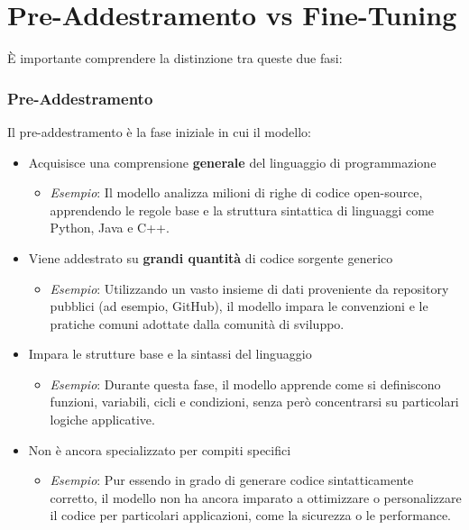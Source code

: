 \documentclass[12pt,a4paper,openright,twoside]{book}
\begin{document}
\section{Pre-Addestramento vs Fine-Tuning} 
È importante comprendere la distinzione tra queste due fasi:
   
\subsubsection{Pre-Addestramento}
Il pre-addestramento è la fase iniziale in cui il modello:
\begin{itemize}
    \item Acquisisce una comprensione \textbf{generale} del linguaggio di programmazione
        \begin{itemize}
            \item \textit{Esempio}: Il modello analizza milioni di righe di codice open-source, apprendendo le regole base e la struttura sintattica di linguaggi come Python, Java e C++.
        \end{itemize}
    \item Viene addestrato su \textbf{grandi quantità} di codice sorgente generico
        \begin{itemize}
            \item \textit{Esempio}: Utilizzando un vasto insieme di dati proveniente da repository pubblici (ad esempio, GitHub), il modello impara le convenzioni e le pratiche comuni adottate dalla comunità di sviluppo.
        \end{itemize}
    \item Impara le strutture base e la sintassi del linguaggio
        \begin{itemize}
            \item \textit{Esempio}: Durante questa fase, il modello apprende come si definiscono funzioni, variabili, cicli e condizioni, senza però concentrarsi su particolari logiche applicative.
        \end{itemize}
    \item Non è ancora specializzato per compiti specifici
        \begin{itemize}
            \item \textit{Esempio}: Pur essendo in grado di generare codice sintatticamente corretto, il modello non ha ancora imparato a ottimizzare o personalizzare il codice per particolari applicazioni, come la sicurezza o le performance.
        \end{itemize}
\end{itemize}
\end{document}
